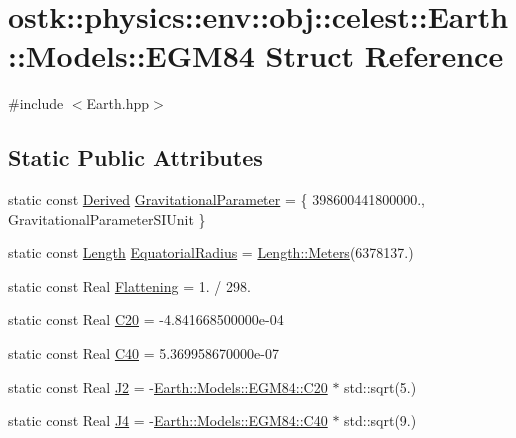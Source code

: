 \hypertarget{structostk_1_1physics_1_1env_1_1obj_1_1celest_1_1_earth_1_1_models_1_1_e_g_m84}{}\section{ostk\+:\+:physics\+:\+:env\+:\+:obj\+:\+:celest\+:\+:Earth\+:\+:Models\+:\+:E\+G\+M84 Struct Reference}
\label{structostk_1_1physics_1_1env_1_1obj_1_1celest_1_1_earth_1_1_models_1_1_e_g_m84}


{\ttfamily \#include $<$Earth.\+hpp$>$}

\subsection*{Static Public Attributes}
\begin{DoxyCompactItemize}
\item 
static const \hyperlink{classostk_1_1physics_1_1units_1_1_derived}{Derived} \hyperlink{structostk_1_1physics_1_1env_1_1obj_1_1celest_1_1_earth_1_1_models_1_1_e_g_m84_a9a8ef2e6a26175b53adef3b1b2e6a6de}{Gravitational\+Parameter} = \{ 398600441800000., Gravitational\+Parameter\+S\+I\+Unit \}
\item 
static const \hyperlink{classostk_1_1physics_1_1units_1_1_length}{Length} \hyperlink{structostk_1_1physics_1_1env_1_1obj_1_1celest_1_1_earth_1_1_models_1_1_e_g_m84_ac5a2a2a2c4ddcca8b783d7dad4a97a94}{Equatorial\+Radius} = \hyperlink{classostk_1_1physics_1_1units_1_1_length_ad227977ce00756791595796a0dd5ddd7}{Length\+::\+Meters}(6378137.)
\item 
static const Real \hyperlink{structostk_1_1physics_1_1env_1_1obj_1_1celest_1_1_earth_1_1_models_1_1_e_g_m84_a4247baaddb53dd36b704b7229ba1573a}{Flattening} = 1. / 298.
\item 
static const Real \hyperlink{structostk_1_1physics_1_1env_1_1obj_1_1celest_1_1_earth_1_1_models_1_1_e_g_m84_ac1165ee364cac2d3c55f779cc95bd6f0}{C20} = -\/4.\+841668500000e-\/04
\item 
static const Real \hyperlink{structostk_1_1physics_1_1env_1_1obj_1_1celest_1_1_earth_1_1_models_1_1_e_g_m84_abecab6f1755e1e19365f3f1d8eedc250}{C40} = 5.\+369958670000e-\/07
\item 
static const Real \hyperlink{structostk_1_1physics_1_1env_1_1obj_1_1celest_1_1_earth_1_1_models_1_1_e_g_m84_a98c6150b7c55df8e9c995bb30d897e1b}{J2} = -\/\hyperlink{structostk_1_1physics_1_1env_1_1obj_1_1celest_1_1_earth_1_1_models_1_1_e_g_m84_ac1165ee364cac2d3c55f779cc95bd6f0}{Earth\+::\+Models\+::\+E\+G\+M84\+::\+C20} $\ast$ std\+::sqrt(5.)
\item 
static const Real \hyperlink{structostk_1_1physics_1_1env_1_1obj_1_1celest_1_1_earth_1_1_models_1_1_e_g_m84_a3bab15ec6ebd41cfa191526da7b9a5b3}{J4} = -\/\hyperlink{structostk_1_1physics_1_1env_1_1obj_1_1celest_1_1_earth_1_1_models_1_1_e_g_m84_abecab6f1755e1e19365f3f1d8eedc250}{Earth\+::\+Models\+::\+E\+G\+M84\+::\+C40} $\ast$ std\+::sqrt(9.)
\end{DoxyCompactItemize}


